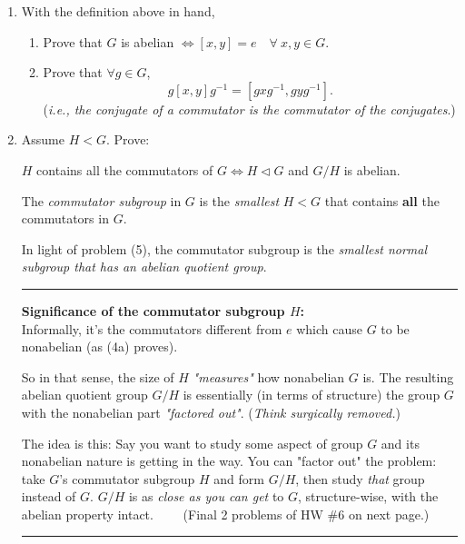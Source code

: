 \begin{enumerate}
    \item With the definition above in hand,
    \begin{enumerate}
        \item Prove that $ G $ is abelian $ \iff [x,y] = e \quad \forall \ x,y \in G $.
        \item Prove that $ \forall g \in G $, 
        \[
        g[x,y]g^{-1} = [g x g^{-1}, g y g^{-1}].
        \]
        (\textit{i.e., the conjugate of a commutator is the commutator of the conjugates}.) \\ \steezybreak
    \end{enumerate}
    
    \item Assume $ H < G $. Prove:
    
    $ H $ contains all the commutators of $ G \iff H \triangleleft G $ and $ G/H $ is abelian. \\ \steezybreak

    \begin{definition}
        The \textit{commutator subgroup} in $ G $ is the \textit{smallest} $ H < G $ that contains \textbf{all} the commutators in $ G $.
    \end{definition}
    
    In light of problem (5), the commutator subgroup is the \textit{smallest normal subgroup that has an abelian quotient group}. \\ \steezybreak
    
    \noindent \rule{\textwidth}{0.4pt}
    
    \textbf{Significance of the commutator subgroup $ H $:} \\
    Informally, it's the commutators different from $ e $ which cause $ G $ to be nonabelian (as (4a) proves). 
    
    So in that sense, the size of $ H $ \textit{"measures"} how nonabelian $ G $ is. The resulting abelian quotient group $ G/H $ is essentially (in terms of structure) the group $ G $ with the nonabelian part \textit{"factored out"}. (\textit{Think surgically removed.}) \\ \steezybreak
    
    The idea is this: Say you want to study some aspect of group $ G $ and its nonabelian nature is getting in the way. You can "factor out" the problem: take $ G $'s commutator subgroup $ H $ and form $ G/H $, then study \textit{that} group instead of $ G $. $ G/H $ is as \textit{close as you can get} to $ G $, structure-wise, with the abelian property intact. \ \ \ \ (Final 2 problems of HW \#6 on next page.)\\ \steezybreak
    \noindent \rule{\textwidth}{0.4pt}
    \newpage


\end{enumerate}
